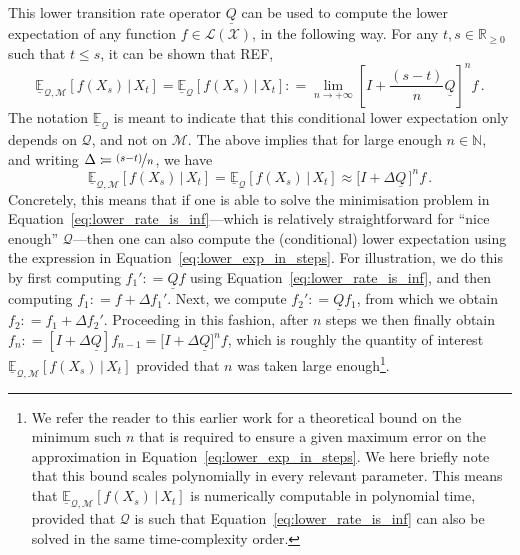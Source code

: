 \documentclass[twoside,11pt]{article}
\newcommand{\nats}{\mathbb{N}}
\newcommand{\reals}{\mathbb{R}}
\newcommand{\realsnonneg}{\reals_{\geq 0}}
\newcommand{\states}{\mathcal{X}}
\newcommand{\lexp}{\underline{\mathbb{E}}_{\rateset,\mathcal{M}}}
\newcommand{\gambles}{\mathcal{L}}
\newcommand{\gamblesX}{\gambles(\states)}
\newcommand{\rateset}{\mathcal{Q}}
\newcommand{\lrate}{\underline{Q}}
\newcommand{\coloneqq}{:\!=}
\begin{document}
This lower transition rate operator $\lrate$ can be used to compute the lower expectation of any function $f\in\gamblesX$, in the following way. For any $t,s\in\realsnonneg$ such that $t\leq s$, it can be shown that REF,
\begin{equation*}
\lexp[f(X_s)\,\vert\,X_t] = \underline{\mathbb{E}}_\rateset[f(X_s)\,\vert\,X_t] \coloneqq \lim_{n\to+\infty}\left[I+\frac{(s-t)}{n}\lrate\right]^n f\,.
\end{equation*}
The notation $\underline{\mathbb{E}}_\rateset$ is meant to indicate that this conditional lower expectation only depends on $\rateset$, and not on $\mathcal{M}$. The above implies that for large enough $n\in\nats$, and writing $\Delta\coloneqq \nicefrac{(s-t)}{n}$, we have
\begin{equation}\label{eq:lower_exp_in_steps}
\lexp[f(X_s)\,\vert\,X_t] = \underline{\mathbb{E}}_\rateset[f(X_s)\,\vert\,X_t] \approx \bigl[I + \Delta\lrate\,\bigr]^nf\,.
\end{equation}
Concretely, this means that if one is able to solve the minimisation problem in Equation~\eqref{eq:lower_rate_is_inf}---which is relatively straightforward for ``nice enough'' $\rateset$---then one can also compute the (conditional) lower expectation using the expression in Equation~\ref{eq:lower_exp_in_steps}. For illustration, we do this by first computing $f_1'\coloneqq \lrate f$ using Equation~\eqref{eq:lower_rate_is_inf}, and then computing $f_1\coloneqq f + \Delta f_1'$. Next, we compute $f_2'\coloneqq \lrate f_1$, from which we obtain $f_2\coloneqq f_1 + \Delta f_2'$. Proceeding in this fashion, after $n$ steps we then finally obtain $f_n \coloneqq [I+\Delta\lrate]f_{n-1} = \bigl[I+\Delta\lrate\bigr]^nf$, which is roughly the quantity of interest $\underline{\mathbb{E}}_{\rateset,\mathcal{M}}[f(X_s)\,\vert\,X_t]$ provided that $n$ was taken large enough\footnote{We refer the reader to this earlier work for a theoretical bound on the minimum such $n$ that is required to ensure a given maximum error on the approximation in Equation~\eqref{eq:lower_exp_in_steps}. We here briefly note that this bound scales polynomially in every relevant parameter. This means that $\lexp[f(X_s)\,\vert\,X_t]$ is numerically computable in polynomial time, provided that $\rateset$ is such that Equation~\eqref{eq:lower_rate_is_inf} can also be solved in the same time-complexity order.}.
\end{document}

